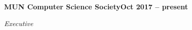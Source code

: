 \vspace{0.1cm}
\textbf{MUN Computer Science Society\hfill Oct 2017 -- present} \par
\textit{Executive} \par